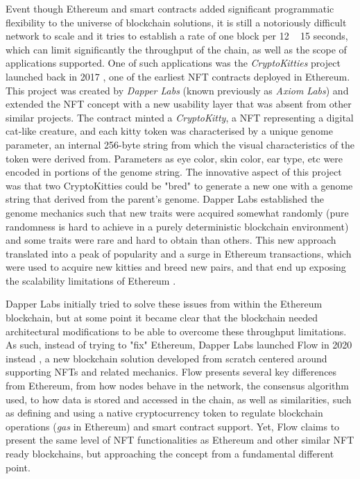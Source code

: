\documentclass[../access.tex]{subfiles}
\begin{document}
\par
Event though Ethereum and smart contracts added significant programmatic flexibility to the universe of blockchain solutions, it is still a notoriously difficult network to scale and it tries to establish a rate of one block per 12 ~ 15 seconds, which can limit significantly the throughput of the chain, as well as the scope of applications supported. One of such applications was the \textit{CryptoKitties} project launched back in 2017 \cite{Dapper2017}, one of the earliest NFT contracts deployed in Ethereum. This project was created by \textit{Dapper Labs} (known previously as \textit{Axiom Labs}) and extended the NFT concept with a new usability layer that was absent from other similar projects. The contract minted a \textit{CryptoKitty}, a NFT representing a digital cat-like creature, and each kitty token was characterised by a unique genome parameter, an internal 256-byte string from which the visual characteristics of the token were derived from. Parameters as eye color, skin color, ear type, etc were encoded in portions of the genome string. The innovative aspect of this project was that two CryptoKitties could be "bred" to generate a new one with a genome string that derived from the parent's genome. Dapper Labs established the genome mechanics such that new traits were acquired somewhat randomly (pure randomness is hard to achieve in a purely deterministic blockchain environment) and some traits were rare and hard to obtain than others. This new approach translated into a peak of popularity and a surge in Ethereum transactions, which were used to acquire new kitties and breed new pairs, and that end up exposing the scalability limitations of Ethereum \cite{bbc2017}.
\par
Dapper Labs initially tried to solve these issues from within the Ethereum blockchain, but at some point it became clear that the blockchain needed architectural modifications to be able to overcome these throughput limitations. As such, instead of trying to "fix" Ethereum, Dapper Labs launched Flow in 2020 instead \cite{Gharegozlou2019}, a new blockchain solution developed from scratch centered around supporting NFTs and related mechanics. Flow presents several key differences from Ethereum, from how nodes behave in the network, the consensus algorithm used, to how data is stored and accessed in the chain, as well as similarities, such as defining and using a native cryptocurrency token to regulate blockchain operations (\textit{gas} in Ethereum) and smart contract support. Yet, Flow claims to present the same level of NFT functionalities as Ethereum and other similar NFT ready blockchains, but approaching the concept from a fundamental different point.
\end{document}
